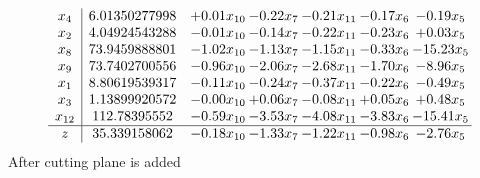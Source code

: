 \documentclass[8pt]{article}
\begin{document}
\[\begin{array}{c| c c@{\hskip 2pt} c@{\hskip 2pt} c@{\hskip 2pt} c@{\hskip 2pt} c@{\hskip 2pt} }
 x_{4}   &  6.01350277998 & +  0.01 x_{10} & -0.22 x_{7} & -0.21 x_{11} & -0.17 x_{6} & -0.19 x_{5}\\
 x_{2}   &  4.04924543288 & -0.01 x_{10} & -0.14 x_{7} & -0.22 x_{11} & -0.23 x_{6} & +  0.03 x_{5}\\
 x_{8}   &  73.9459888801 & -1.02 x_{10} & -1.13 x_{7} & -1.15 x_{11} & -0.33 x_{6} & -15.23 x_{5}\\
 x_{9}   &  73.7402700556 & -0.96 x_{10} & -2.06 x_{7} & -2.68 x_{11} & -1.70 x_{6} & -8.96 x_{5}\\
 x_{1}   &  8.80619539317 & -0.11 x_{10} & -0.24 x_{7} & -0.37 x_{11} & -0.22 x_{6} & -0.49 x_{5}\\
 x_{3}   &  1.13899920572 & -0.00 x_{10} & +  0.06 x_{7} & -0.08 x_{11} & +  0.05 x_{6} & +  0.48 x_{5}\\
 x_{12}   &  112.78395552 & -0.59 x_{10} & -3.53 x_{7} & -4.08 x_{11} & -3.83 x_{6} & -15.41 x_{5}\\
\hline
z    &  35.339158062 & -0.18 x_{10} & -1.33 x_{7} & -1.22 x_{11} & -0.98 x_{6} & -2.76 x_{5}\\
\end{array}\]
 After cutting plane is added 
\end{document}
